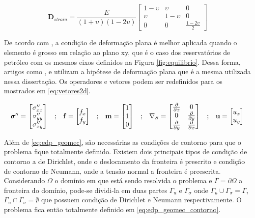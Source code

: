 \begin{equation} \label{eq:elasticplanestrain}
\mathbf{D}_{strain} = \frac{E}{(1+\upsilon)(1-2\upsilon)}
\begin{bmatrix}
 1-\upsilon & \upsilon    &  0 \\
 \upsilon   &  1-\upsilon &  0 \\
 0& 0 & \frac{1-2\upsilon}{2}
\end{bmatrix}
\end{equation}

De acordo com \citet{jacob}, a condição de deformação plana é melhor aplicada quando o elemento é grosso em relação ao plano xy, que é o caso dos reservatórios de petróleo com os mesmos eixos definidos na Figura \ref{fig:equilibrio}. Dessa forma, artigos como \cite{casteletto}, \cite{planeStrainProblems} e \cite{irina} utilizam a hipótese de deformação plana que é a mesma utilizada nessa dissertação. Os operadores e vetores podem ser redefinidos para os mostrados em \eqref{eq:vetores2d}.

\begin{equation}
\label{eq:vetores2d}
\begin{matrix}
\pmb{\sigma}^{\prime\prime} = \begin{bmatrix}
\sigma^{\prime\prime}_{xx}
\\
\sigma^{\prime\prime}_{yy}
\\
\sigma^{\prime\prime}_{xy}
\end{bmatrix}
&

;

&

\mathbf{f} = \begin{bmatrix}
f_{x}
\\
f_{y}
\end{bmatrix}
&
;
&

\mathbf{m} = \begin{bmatrix} 1 \\ 1 \\ 0\end{bmatrix}

&
;

&
\nabla_S = \begin{bmatrix} \frac{\partial { }}{\partial x} & 0 \\ 0 & \frac{\partial { }}{\partial y} \\ \frac{\partial { }}{\partial y} & \frac{\partial { }}{\partial x} \\ \end{bmatrix}

&
;

&

\mathbf{u} = \begin{bmatrix}
u_x
\\
u_y
\end{bmatrix}

\end{matrix}
\end{equation}

Além de \eqref{eq:edp_geomec}, são necessárias as condições de contorno para que o problema fique totalmente definido. Existem dois principais tipos de condição de contorno a de Dirichlet, onde o deslocamento da fronteira é prescrito e condição de contorno de Neumann, onde a tensão normal a fronteira é preescrita. Considerando $\Omega$ o domínio em que está sendo resolvida o problema e $\Gamma = \partial \Omega$ a fronteira do domínio, pode-se dividi-la em duas partes $\Gamma_u$ e $\Gamma_{\sigma}$ onde $\Gamma_u \cup \Gamma_{\sigma} = \Gamma$, $\Gamma_u \cap \Gamma_{\sigma} = \emptyset $ que possuem condição de Dirichlet e Neumann respectivamente. O problema fica então totalmente definido em \eqref{eq:edp_geomec_contorno}.


